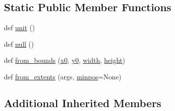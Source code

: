 \subsection*{Static Public Member Functions}
\begin{DoxyCompactItemize}
\item 
def \hyperlink{classmatplotlib_1_1transforms_1_1Bbox_a8e4cdb81d1b8f23d1a69bb3636e1269b}{unit} ()
\item 
def \hyperlink{classmatplotlib_1_1transforms_1_1Bbox_af69851c1996643bfbc0ad430932c1f42}{null} ()
\item 
def \hyperlink{classmatplotlib_1_1transforms_1_1Bbox_a56df96540627a2afe56414c45b8cf105}{from\+\_\+bounds} (\hyperlink{classmatplotlib_1_1transforms_1_1Bbox_a2205c0684b77bfbc2c7a053a0bda7fda}{x0}, \hyperlink{classmatplotlib_1_1transforms_1_1Bbox_a0bd437549aae55a13e0d43517ecc70f3}{y0}, \hyperlink{classmatplotlib_1_1transforms_1_1BboxBase_adf5b955aae1307fb4541cdcc5bd7acf2}{width}, \hyperlink{classmatplotlib_1_1transforms_1_1BboxBase_acec125d4af62a957effbc684a26e5ce2}{height})
\item 
def \hyperlink{classmatplotlib_1_1transforms_1_1Bbox_a72b35a14dbf28b8afad449dd64dcfaf8}{from\+\_\+extents} (args, \hyperlink{classmatplotlib_1_1transforms_1_1Bbox_abd512e3de9afb881da01cee84f5eab5c}{minpos}=None)
\end{DoxyCompactItemize}
\subsection*{Additional Inherited Members}


